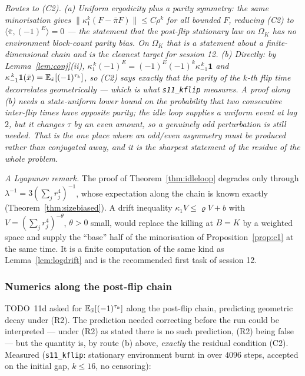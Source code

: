 \emph{Routes to (C2).  (a) Uniform ergodicity plus a parity symmetry:
the same minorisation gives
$\|\kappa_1^k(F-\bar\pi F)\|\le C\rho^k$ for all bounded $F$, reducing
(C2) to $\langle\bar\pi,(-1)^E\rangle=0$ --- the statement that the
post-flip stationary law on $\Omega_K$ has no environment block-count
parity bias.  On $\Omega_K$ that is a statement about a
finite-dimensional chain and is the cleanest target for session 12.
(b) Directly: by Lemma~\ref{lem:conj}(ii),
$\kappa_1^{\,k}(-1)^E=(-1)^{E}(-1)^k\kappa_{-1}^{\,k}\mathbf 1$ and
$\kappa_{-1}^{\,k}\mathbf 1(\bar x)=\mathbb{E}_{\bar x}[(-1)^{\tau_k}]$, so
(C2) says exactly that the parity of the $k$-th flip time decorrelates
geometrically --- which is what \texttt{s11\_kflip} measures.  A proof
along (b) needs a state-uniform lower bound on the probability that
two consecutive inter-flip times have opposite parity; the idle loop
supplies a uniform event at lag $2$, but it changes $\tau$ by an
\emph{even} amount, so a genuinely odd perturbation is still needed.
That is the one place where an odd/even asymmetry must be produced
rather than conjugated away, and it is the sharpest statement of the
residue of the whole problem.}

\emph{A Lyapunov remark.}  The proof of Theorem~\ref{thm:idleloop}
degrades only through $\lambda^{-1}=3(\sum_jr_j^4)^{-1}$, whose
expectation along the chain is known exactly
(Theorem~\ref{thm:sizebiased}).  A drift inequality
$\kappa_1V\le\varrho V+b$ with $V=(\sum_jr_j^4)^{-\theta}$, $\theta>0$
small, would replace the killing at $B=K$ by a weighted space and
supply the ``base'' half of the minorisation of
Proposition~\ref{prop:c1} at the same time.  It is a finite
computation of the same kind as Lemma~\ref{lem:logdrift} and is the
recommended first task of session 12.

\subsubsection{Numerics along the post-flip chain}\label{sec:s11num}

TODO~11d asked for $\mathbb{E}_{\bar x}[(-1)^{\tau_k}]$ along the post-flip
chain, predicting geometric decay under (R2).  The prediction needed
correcting before the run could be interpreted --- under (R2) as stated
there is no such prediction, (R2) being false --- but the quantity is,
by route (b) above, \emph{exactly} the residual condition (C2).
Measured (\texttt{s11\_kflip}: stationary environment burnt in over
$4096$ steps, accepted on the initial gap, $k\le16$, no censoring):

